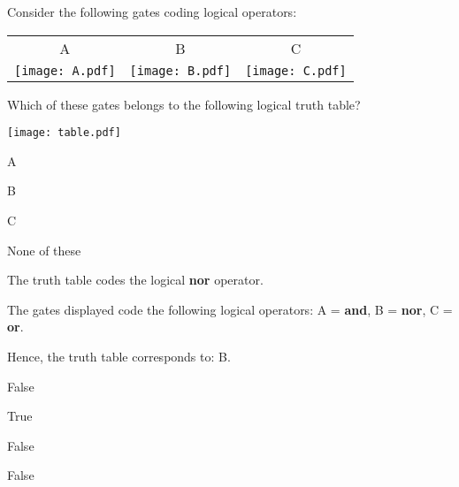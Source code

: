 
\begin{question}

Consider the following gates coding logical operators:

\begin{tabular}{ccc}
A & B & C\\

\texttt{[image: A.pdf]}
&

\texttt{[image: B.pdf]}
&

\texttt{[image: C.pdf]}
\end{tabular}

Which of these gates belongs to the following logical truth table?

\texttt{[image: table.pdf]}

\begin{answerlist}
  \item A
  \item B
  \item C
  \item None of these
\end{answerlist}
\end{question}


\begin{solution}

The truth table codes the logical \textbf{nor} operator.

The gates displayed code the following logical operators:
A = \textbf{and},
B = \textbf{nor},
C = \textbf{or}.

Hence, the truth table corresponds to:
B.

\begin{answerlist}
  \item False
  \item True
  \item False
  \item False
\end{answerlist}
\end{solution}

